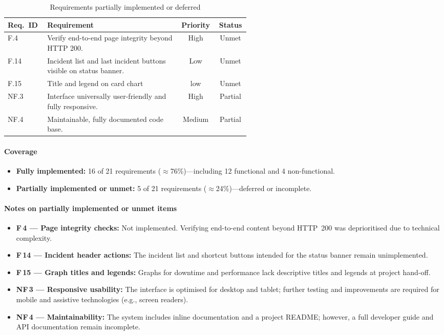 \begin{table}[H]
\centering
\begin{tabular}{|l|p{0.55\linewidth}|c|c|}
\hline
\textbf{Req.\ ID} & \textbf{Requirement} & \textbf{Priority} & \textbf{Status}\\ \hline
F.4  & Verify end-to-end page integrity beyond HTTP 200. & High & Unmet \\ \hline 
F.14 & Incident list and last incident buttons visible on status banner.& Low&Unmet\\ \hline 
F.15 & Title and legend on card chart& low&Unmet\\\hline\hline \hline
NF.3 & Interface universally user-friendly and fully responsive. & High & Partial \\ \hline
NF.4 & Maintainable, fully documented code base. & Medium & Partial \\ \hline
\end{tabular}
\caption{Requirements partially implemented or deferred}
\label{tab:req_incomplete}
\end{table}

\paragraph{Coverage}
\begin{itemize}
    \item \textbf{Fully implemented:} 16 of 21 requirements ($\approx$76\%)—including 12 functional and 4 non-functional.
    \item \textbf{Partially implemented or unmet:} 5 of 21 requirements ($\approx$24\%)—deferred or incomplete.
\end{itemize}

\paragraph{Notes on partially implemented or unmet items}
\begin{itemize}
    \item \textbf{F\,4 — Page integrity checks:} Not implemented. Verifying end-to-end content beyond HTTP~200 was deprioritised due to technical complexity.
    \item \textbf{F\,14 — Incident header actions:} The incident list and shortcut buttons intended for the status banner remain unimplemented.
    \item \textbf{F\,15 — Graph titles and legends:} Graphs for downtime and performance lack descriptive titles and legends at project hand-off.
    \item \textbf{NF\,3 — Responsive usability:} The interface is optimised for desktop and tablet; further testing and improvements are required for mobile and assistive technologies (e.g., screen readers).
    \item \textbf{NF\,4 — Maintainability:} The system includes inline documentation and a project README; however, a full developer guide and API documentation remain incomplete.
\end{itemize}

